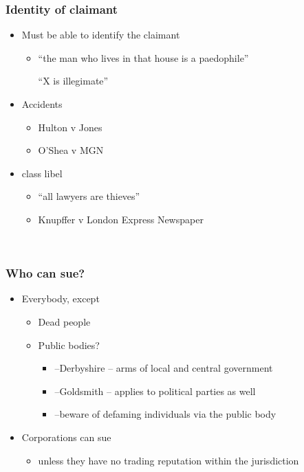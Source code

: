 \documentclass[ignorenonframetext,]{beamer}
\begin{document}
\begin{frame}
\frametitle{Identity of claimant}

\begin{itemize}
\item  Must be able to identify the claimant

  \begin{itemize}
  \item    ``the man who lives in that house is a paedophile''

    ``X is illegimate''
  \end{itemize}
\item  Accidents

  \begin{itemize}
  \item    Hulton v Jones 
  \item    O'Shea v MGN
  \end{itemize}
\item  class libel 

  \begin{itemize}
  \item    ``all lawyers are thieves''
  \item    Knupffer v London Express Newspaper
  \end{itemize}
\end{itemize}

~


\end{frame}

\begin{frame}
\frametitle{Who can sue?}

\begin{itemize}
\item  Everybody, except

  \begin{itemize}
  \item    Dead people
  \item    Public bodies?

    \begin{itemize}
    \item      {--}{Derbyshire}{ -- arms of local and central government}
    \item      {--}{Goldsmith}{ -- applies to political parties as well}
    \item      {--}{beware of defaming individuals via the public body}
    \end{itemize}
  \end{itemize}
\item  {Corporations can sue}

  \begin{itemize}
  \item    {unless they have no trading reputation within the
    jurisdiction}
  \end{itemize}
\end{itemize}

~


\end{frame}
\end{document}
